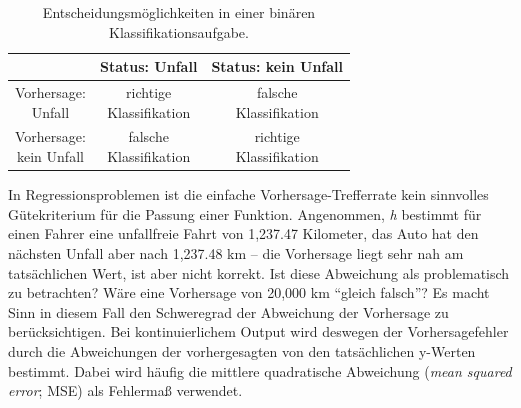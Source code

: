 \begin{table}[h!]
  \centering
  \caption{Entscheidungsmöglichkeiten in einer binären Klassifikationsaufgabe.}

\vspace{0.3cm}
  \def\arraystretch{1.5}%
  \label{tab:svm_table2}
  \begin{tabular}{c|c|c}
     & Status: Unfall & Status: kein Unfall \\

 \hline
    \parbox[t]{2.2cm}{Vorhersage:\\ Unfall\\}
    & \parbox[t]{2.2cm}{richtige\\Klassifikation \\}
    & \parbox[t]{2.2cm}{falsche\\Klassifikation \\} \\

 \hline
    \parbox[t]{2.2cm}{Vorhersage:\\ kein Unfall\\}
    & \parbox[t]{2.2cm}{falsche\\Klassifikation \\}
    & \parbox[t]{2.2cm}{richtige\\Klassifikation \\} \\


  \end{tabular}
\end{table}

\vspace{0.3cm}

In Regressionsproblemen ist die einfache Vorhersage-Trefferrate kein sinnvolles
Gütekriterium für die Passung einer Funktion. Angenommen, \emph{h} bestimmt für einen
Fahrer eine unfallfreie Fahrt von 1,237.47 Kilometer, das Auto hat den nächsten
Unfall aber nach 1,237.48 km -- die Vorhersage liegt sehr nah am tatsächlichen Wert,
ist aber nicht korrekt. Ist diese Abweichung als problematisch zu betrachten?  Wäre
eine Vorhersage von 20,000 km "`gleich falsch"'? Es macht Sinn in diesem Fall den
Schweregrad der Abweichung der Vorhersage zu berücksichtigen. Bei kontinuierlichem
Output wird deswegen der Vorhersagefehler durch die Abweichungen der vorhergesagten
von den tatsächlichen y-Werten bestimmt. Dabei wird häufig die mittlere quadratische
Abweichung (\emph{mean squared error}; MSE) als Fehlermaß verwendet.

\vspace{0.3cm}

